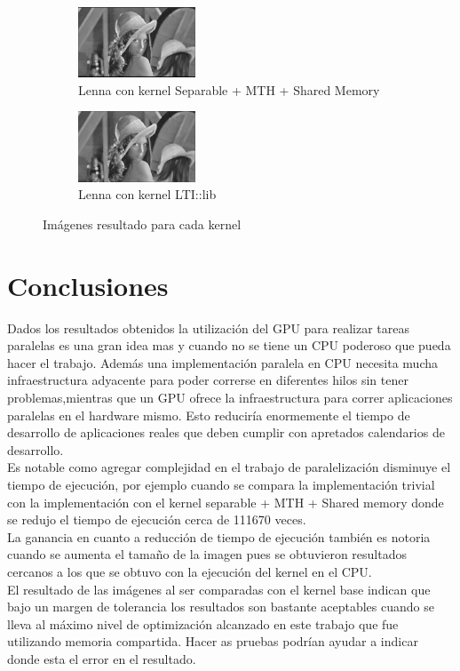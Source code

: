 \documentclass[conference]{IEEEtran}
\begin{document}
\begin{figure}[H]
  \begin{subfigure}[b]{0.2\textwidth}
    \centering\includegraphics[width=3.5cm]{lenna_shared}
    \caption{Lenna con kernel Separable + MTH + Shared Memory}
  \end{subfigure}
  \begin{subfigure}[b]{0.2\textwidth}
    \centering\includegraphics[width=3.5cm]{lenna_lti}
    \caption{Lenna con kernel LTI::lib}
  \end{subfigure}
  \caption{Imágenes resultado para cada kernel}
  \label{img_results}
\end{figure}


\section{\textbf{Conclusiones}}
Dados los resultados obtenidos la utilización del GPU para realizar tareas paralelas es una gran idea mas y cuando no se tiene un CPU poderoso que pueda hacer el trabajo. Además una implementación paralela en CPU necesita mucha infraestructura adyacente para poder correrse en diferentes hilos sin tener problemas,mientras que un GPU ofrece la infraestructura para correr aplicaciones paralelas en el hardware mismo. Esto reduciría enormemente el tiempo de desarrollo de aplicaciones reales que deben cumplir con apretados calendarios de desarrollo.\\
Es notable como agregar complejidad en el trabajo de paralelización disminuye el tiempo de ejecución, por ejemplo cuando se compara la implementación trivial con la implementación con el kernel separable + MTH + Shared memory donde se redujo el tiempo de ejecución cerca de 111670 veces.\\
La ganancia en cuanto a reducción de tiempo de ejecución también es notoria cuando se aumenta el tamaño de la imagen pues se obtuvieron resultados cercanos a los que se obtuvo con la ejecución del kernel en el CPU.\\
El resultado de las imágenes al ser comparadas con el kernel base indican que bajo un margen de tolerancia los resultados son bastante aceptables cuando se lleva al máximo nivel de optimización alcanzado en este trabajo que fue utilizando memoria compartida. Hacer as pruebas podrían ayudar a indicar donde esta el error en el resultado.
 
\end{document}
